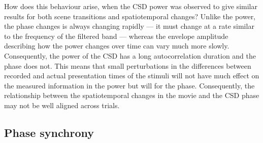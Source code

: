 How does this behaviour arise, when the \ac{CSD} power was observed to give similar results for both scene transitions and spatiotemporal changes?
Unlike the power, the phase changes is always changing rapidly --- it must change at a rate similar to the frequency of the filtered band --- whereas the envelope amplitude describing how the power changes over time can vary much more slowly.
Consequently, the power of the \ac{CSD} has a long autocorrelation duration and the phase does not.
This means that small perturbations in the differences between recorded and actual presentation times of the stimuli will not have much effect on the measured information in the power but will for the phase.
Consequently, the relationship between the spatiotemporal changes in the movie and the \ac{CSD} phase may not be well aligned across trials.


\subsection{Phase synchrony}


